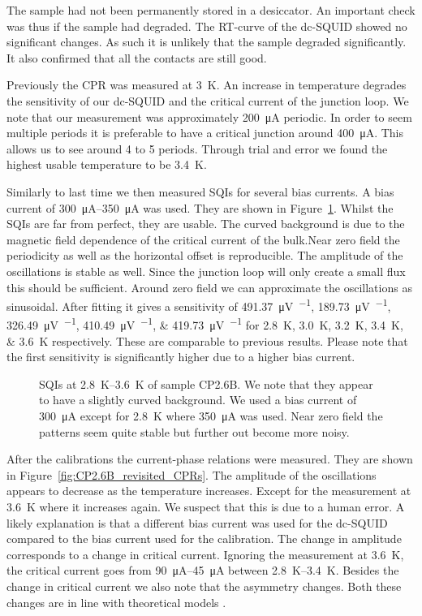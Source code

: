 The sample had not been permanently stored in a desiccator. An important check was thus if the sample had degraded. The RT-curve of the dc-SQUID showed no significant changes. As such it is unlikely that the sample degraded significantly. It also confirmed that all the contacts are still good.

Previously the CPR was measured at \qty{3}{\kelvin}. An increase in temperature degrades the sensitivity of our dc-SQUID and the critical current of the junction loop. We note that our measurement was approximately \qty{200}{\micro\ampere} periodic. In order to seem multiple periods it is preferable to have a critical junction around \qty{400}{\micro\ampere}. This allows us to see around 4 to 5 periods. Through trial and error we found the highest usable temperature to be \qty{3.4}{\kelvin}.

Similarly to last time we then measured SQIs for several bias currents. A bias current of \qtyrange{300}{350}{\micro\ampere} was used. They are shown in Figure~\ref{fig:CP2.6B_revisited_SQIs}. Whilst the SQIs are far from perfect, they are usable. The curved background is due to the magnetic field dependence of the critical current of the bulk.Near zero field the periodicity as well as the horizontal offset is reproducible. The amplitude of the oscillations is stable as well. Since the junction loop will only create a small flux this should be sufficient. Around zero field we can approximate the oscillations as sinusoidal. After fitting it gives a sensitivity of \qtylist{491.37;189.73;326.49;410.49;419.73}{\micro\volt\per\fluxquantum} for \qtylist{2.8;3.0;3.2;3.4;3.6}{\kelvin} respectively. These are comparable to previous results. Please note that the first sensitivity is significantly higher due to a higher bias current.

\begin{figure}[ht!]
	\centering
	
	\caption{SQIs at \qtyrange{2.8}{3.6}{\kelvin} of sample CP2.6B. We note that they appear to have a slightly curved background. We used a bias current of \qty{300}{\micro\ampere} except for \qty{2.8}{\kelvin} where \qty{350}{\micro\ampere} was used. Near zero field the patterns seem quite stable but further out become more noisy.}
	\label{fig:CP2.6B_revisited_SQIs}
\end{figure}

After the calibrations the current-phase relations were measured. They are shown in Figure~\ref{fig:CP2.6B_revisited_CPRs}. The amplitude of the oscillations appears to decrease as the temperature increases. Except for the measurement at \qty{3.6}{\kelvin} where it increases again. We suspect that this is due to a human error. A likely explanation is that a different bias current was used for the dc-SQUID compared to the bias current used for the calibration. The change in amplitude corresponds to a change in critical current. Ignoring the measurement at \qty{3.6}{\kelvin}, the critical current goes from \qtyrange{90}{45}{\micro\ampere} between \qtyrange{2.8}{3.4}{\kelvin}. Besides the change in critical current we also note that the asymmetry changes. Both these changes are in line with theoretical models \cite{likharevSuperconductingWeakLinks1979}.

